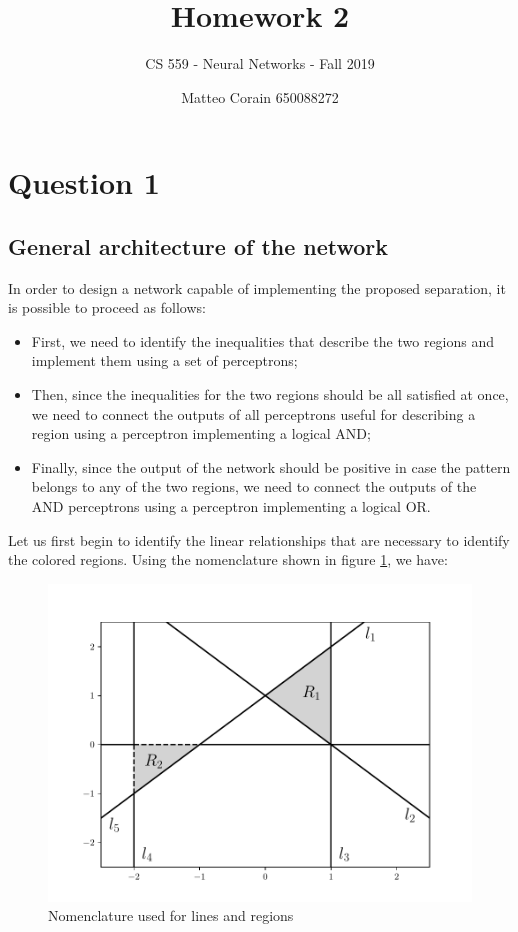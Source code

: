 \documentclass[letterpaper,headings=standardclasses]{scrartcl}
\title{Homework 2}
\subtitle{CS 559 - Neural Networks - Fall 2019}
\author{Matteo Corain 650088272}
\begin{document}
\maketitle

\section{Question 1}

\subsection{General architecture of the network}

In order to design a network capable of implementing the proposed separation, it is possible to proceed as follows:

\begin{itemize}

\item First, we need to identify the inequalities that describe the two regions and implement them using a set of perceptrons;

\item Then, since the inequalities for the two regions should be all satisfied at once, we need to connect the outputs of all perceptrons useful for describing a region using a perceptron implementing a logical AND;

\item Finally, since the output of the network should be positive in case the pattern belongs to any of the two regions, we need to connect the outputs of the AND perceptrons using a perceptron implementing a logical OR.

\end{itemize}

Let us first begin to identify the linear relationships that are necessary to identify the colored regions. Using the nomenclature shown in figure \ref{region_names}, we have:

\begin{figure}[h]
\centering
\includegraphics[width=.7\linewidth]{region_names.pdf}
\caption{Nomenclature used for lines and regions}
\label{region_names}
\end{figure}
\end{document}
